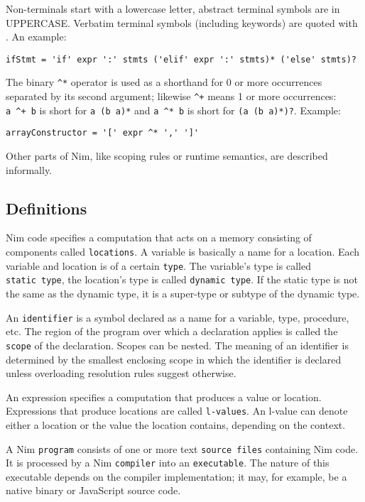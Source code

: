 Non-terminals start with a lowercase letter, abstract terminal symbols
are in UPPERCASE. Verbatim terminal symbols (including keywords) are
quoted with \texttt{\textquotesingle{}}. An example:

\begin{verbatim}
ifStmt = 'if' expr ':' stmts ('elif' expr ':' stmts)* ('else' stmts)?
\end{verbatim}

The binary \texttt{\^{}*} operator is used as a shorthand for 0 or more
occurrences separated by its second argument; likewise \texttt{\^{}+}
means 1 or more occurrences: \texttt{a\ \^{}+\ b} is short for
\texttt{a\ (b\ a)*} and \texttt{a\ \^{}*\ b} is short for
\texttt{(a\ (b\ a)*)?}. Example:

\begin{verbatim}
arrayConstructor = '[' expr ^* ',' ']'
\end{verbatim}

Other parts of Nim, like scoping rules or runtime semantics, are
described informally.

\hypertarget{definitions}{%
\subsection{Definitions}\label{definitions}}

Nim code specifies a computation that acts on a memory consisting of
components called \texttt{locations}. A variable is basically a name for
a location. Each variable and location is of a certain \texttt{type}.
The variable's type is called \texttt{static\ type}, the location's type
is called \texttt{dynamic\ type}. If the static type is not the same as
the dynamic type, it is a super-type or subtype of the dynamic type.

An \texttt{identifier} is a symbol declared as a name for a variable,
type, procedure, etc. The region of the program over which a declaration
applies is called the \texttt{scope} of the declaration. Scopes can be
nested. The meaning of an identifier is determined by the smallest
enclosing scope in which the identifier is declared unless overloading
resolution rules suggest otherwise.

An expression specifies a computation that produces a value or location.
Expressions that produce locations are called \texttt{l-values}. An
l-value can denote either a location or the value the location contains,
depending on the context.

A Nim \texttt{program} consists of one or more text
\texttt{source\ files} containing Nim code. It is processed by a Nim
\texttt{compiler} into an \texttt{executable}. The nature of this
executable depends on the compiler implementation; it may, for example,
be a native binary or JavaScript source code.

